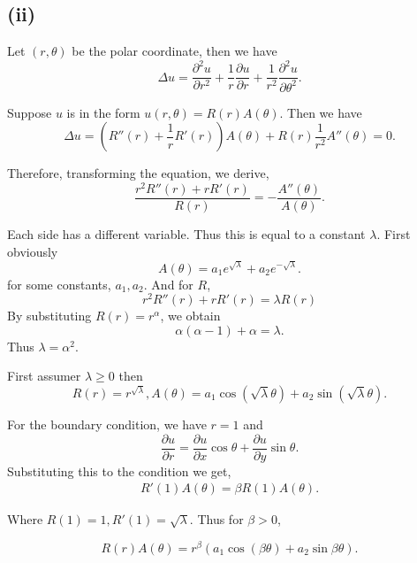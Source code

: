 \documentclass{article}
\begin{document}
\subsection*{(ii)}

Let $(r,\theta)$ be the polar coordinate, then we have
\begin{equation*}
\Delta u = {\frac {\partial^2 u} {\partial r^2}}+{\frac 1 r}{\frac {\partial u} {\partial r}}+{\frac 1 {r^2}}{\frac {\partial^2 u} {\partial \theta^2}}.
\end{equation*}

Suppose $u$ is in the form $u(r,\theta) = R(r)A(\theta)$. Then we have
\begin{equation*}
\Delta u = (R''(r)+{\frac 1 r}R'(r))A(\theta)+R(r){\frac 1 {r^2}}A''(\theta) = 0.
\end{equation*}

Therefore, transforming the equation, we derive,
\begin{equation*}
{\frac {r^2R''(r)+rR'(r)} {R(r)}}=-{\frac {A''(\theta)} {A(\theta)}}.
\end{equation*}

Each side has a different variable. Thus this is equal to a constant $\lambda$. First obviously
\begin{equation*}
A(\theta) = a_1e^{\sqrt{\lambda}}+a_2e^{-\sqrt{\lambda}}.
\end{equation*}
for some constants, $a_1,a_2$. And for $R$,
\begin{equation*}
r^2R''(r)+rR'(r) =\lambda R(r)
\end{equation*}
By substituting $R(r) = r^\alpha$, we obtain
\begin{equation*}
\alpha(\alpha-1)+\alpha = \lambda.
\end{equation*}
Thus $\lambda = \alpha^2$.

First assumer $\lambda \geq 0$ then 
\begin{equation*}
R(r) = r^{\sqrt{\lambda}}, A(\theta) = a_1\cos(\sqrt{\lambda}\theta)+a_2\sin(\sqrt{\lambda}\theta).
\end{equation*}

For the boundary condition, we have $r=1$ and 
\begin{equation*}
{\frac {\partial u} {\partial r}} = {\frac {\partial u} {\partial x}}\cos\theta+{\frac {\partial u} {\partial y}}\sin\theta.
\end{equation*}
Substituting this to the condition we get,
\begin{align*}
R'(1)A(\theta) = \beta R(1)A(\theta).
\end{align*}

Where $R(1) = 1,R'(1) = \sqrt{\lambda}$. Thus for $\beta>0$,

\begin{equation*}
R(r)A(\theta) = r^{\beta}(a_1\cos(\beta\theta)+a_2\sin\beta\theta).
\end{equation*}
\end{document}

